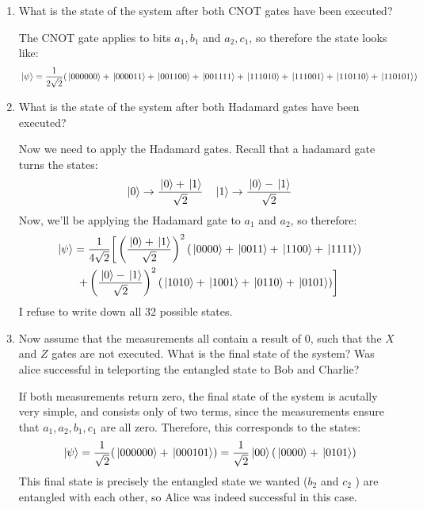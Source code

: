 \documentclass[10pt]{article}
\begin{document}
	\begin{enumerate}[label=\alph*)]
		\item What is the state of the system after both CNOT gates have been executed? 

			\begin{solution}
				The CNOT gate applies to bits \( a_1, b_1  \) and \( a_2, c_1 \), so therefore the state looks like:
				\[
					\ket*{\psi} = \frac{1}{2\sqrt{2} }(\ket*{000000} + \ket*{000011} + \ket*{001100} + \ket*{001111}
					+ \ket*{111010} + \ket*{111001} + \ket*{110110} + \ket*{110101})
				\]
			\end{solution}
		\item What is the state of the system after both Hadamard gates have been executed? 

			\begin{solution}
				Now we need to apply the Hadamard gates. Recall that a hadamard gate turns the states:
				\[
				\ket*{0} \to \frac{\ket*{0} + \ket*{1}}{\sqrt{2} } \quad 
				\ket*{1} \to \frac{\ket*{0} - \ket*{1}}{\sqrt{2} }
				\] 
				Now, we'll be applying the Hadamard gate to \( a_1 \) and \( a_2 \), so therefore:
				\begin{multline*}
				\ket*{\psi} = \frac{1}{4\sqrt{2} }\biggr[\left( \frac{\ket*{0} + \ket*{1}}{\sqrt{2} } \right)^2
					(\ket*{0000} + 
				\ket*{0011} + \ket*{1100} + \ket*{1111})\\ + \left( \frac{\ket*{0} - \ket*{1}}{\sqrt{2} } \right)^2
			(\ket*{1010} + \ket*{1001} + \ket*{0110} + \ket*{0101})\biggr]
			\end{multline*} 
			I refuse to write down all 32 possible states.  
			\end{solution}
		\item Now assume that the measurements all contain a result of 0, such that the \( X \) and \( Z \) gates
			 are not executed. What is the final state of the system? Was alice successful in teleporting the 
			 entangled state to Bob and Charlie?

			 \begin{solution}
			 	If both measurements return zero, the final state of the system is acutally very simple, and consists 
				only of two terms, since the measurements ensure that \( a_1, a_2, b_1, c_1 \) are all zero. Therefore, 
				this corresponds to the states:
				\[
				\ket*{\psi} = \frac{1}{\sqrt{2} }(\ket*{000000} + \ket*{000101}) = \frac{1}{\sqrt{2} }\ket*{00}
				(\ket*{0000} + \ket*{0101})
				\] 
				This final state is precisely the entangled state we wanted (\( b_2 \) and \( c_2 \) ) are entangled
				with each other, so Alice was indeed successful in this case.
			 \end{solution}
	\end{enumerate}
	\pagebreak
\end{document}
